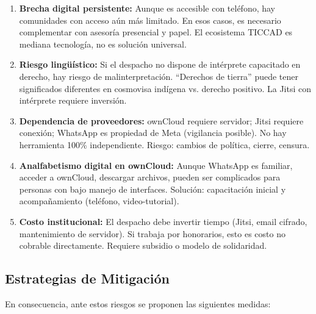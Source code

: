 ﻿\documentclass[
  spanish,
  letterpaper, oneside
]{article}
\begin{document}
\begin{enumerate}
  \item \textbf{Brecha digital persistente:} Aunque es accesible con teléfono, hay comunidades 
  con acceso aún más limitado. En esos casos, es necesario complementar con asesoría presencial 
  y papel. El ecosistema TICCAD es mediana tecnología, no es solución universal.
  
  \item \textbf{Riesgo lingüístico:} Si el despacho no dispone de intérprete capacitado 
  en derecho, hay riesgo de malinterpretación. ``Derechos de tierra'' puede tener significados 
  diferentes en cosmovisa indígena vs. derecho positivo. La Jitsi con intérprete requiere 
  inversión.
  
  \item \textbf{Dependencia de proveedores:} ownCloud requiere servidor; Jitsi requiere 
  conexión; WhatsApp es propiedad de Meta (vigilancia posible). No hay herramienta 100\% 
  independiente. Riesgo: cambios de política, cierre, censura.
  
  \item \textbf{Analfabetismo digital en ownCloud:} Aunque WhatsApp es familiar, acceder 
  a ownCloud, descargar archivos, pueden ser complicados para personas con bajo manejo 
  de interfaces. Solución: capacitación inicial y acompañamiento (teléfono, video-tutorial).
  
  \item \textbf{Costo institucional:} El despacho debe invertir tiempo (Jitsi, email 
  cifrado, mantenimiento de servidor). Si trabaja por honorarios, esto es costo no cobrable 
  directamente. Requiere subsidio o modelo de solidaridad.
\end{enumerate}

\subsection{Estrategias de Mitigación}

En consecuencia, ante estos riesgos se proponen las siguientes medidas:
\end{document}
